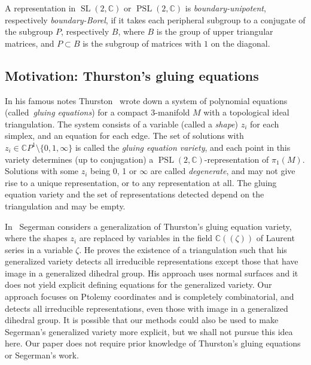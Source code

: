 \documentclass[11pt]{amsart}
\theoremstyle{plain}
\theoremstyle{definition}
\numberwithin{equation}{section}
\newcommand{\C}{\mathbb C}
\DeclareMathOperator{\PSL}{PSL}
\DeclareMathOperator{\SL}{SL}
\begin{document}
A representation in $\SL(2,\C)$ or $\PSL(2,\C)$ is \emph{boundary-unipotent}, respectively \emph{boundary-Borel}, if it takes each peripheral subgroup to a conjugate of the subgroup $P$, respectively $B$, where $B$ is the group of upper triangular matrices, and $P\subset B$ is the subgroup of matrices with $1$ on the diagonal.


\subsection{Motivation: Thurston's gluing equations} In his famous notes Thurston~\cite{ThurstonNotes} wrote down a system of polynomial equations (called~\emph{gluing equations}) for a compact 3-manifold $M$ with a topological ideal triangulation. The system consists of a variable (called a \emph{shape}) $z_i$ for each simplex, and an equation for each edge. The set of solutions with $z_i\in\C P^1\setminus\{0,1,\infty\}$ is called the \emph{gluing equation variety}, and each point in this variety determines (up to conjugation) a $\PSL(2,\C)$-representation of $\pi_1(M)$. Solutions with some $z_i$ being 0, 1 or $\infty$ are called \emph{degenerate}, and may not give rise to a unique representation, or to any representation at all. The gluing equation variety and the set of representations detected depend on the triangulation and may be empty.

In~\cite{Segerman} Segerman considers a generalization of Thurston's gluing equation variety, where the shapes $z_i$ are replaced by variables in the field $\C((\zeta))$ of Laurent series in a variable $\zeta$. He proves the existence of a triangulation such that his generalized variety detects all irreducible representations except those that have image in a generalized dihedral group. His approach uses normal surfaces and it does not yield explicit defining equations for the generalized variety. Our approach focuses on Ptolemy coordinates and is completely combinatorial, and detects all irreducible representations, even those with image in a generalized dihedral group. It is possible that our methods could also be used to make Segerman's generalized variety more explicit, but we shall not pursue this idea here. Our paper does not require prior knowledge of Thurston's gluing equations or Segerman's work.


\end{document}
